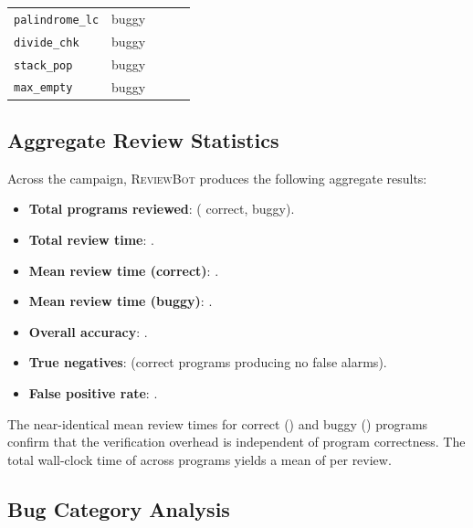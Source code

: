 \documentclass[11pt]{article}
\newcommand{\ReviewBot}{\textsc{ReviewBot}}
\begin{document}
\begin{table}[t]
\begin{tabular}{llrrr}
\texttt{palindrome\_lc} & buggy &
  \ppLXVIIrevpalindromenolowerProps{} &
  \ppLXVIIrevpalindromenolowerTime{} &
  \ppLXVIIrevpalindromenolowerVerdict{} \\
\texttt{divide\_chk} & buggy &
  \ppLXVIIrevdividenocheckProps{} &
  \ppLXVIIrevdividenocheckTime{} &
  \ppLXVIIrevdividenocheckVerdict{} \\
\texttt{stack\_pop} & buggy &
  \ppLXVIIrevstackwrongpopProps{} &
  \ppLXVIIrevstackwrongpopTime{} &
  \ppLXVIIrevstackwrongpopVerdict{} \\
\texttt{max\_empty} & buggy &
  \ppLXVIIrevmaxnoemptycheckProps{} &
  \ppLXVIIrevmaxnoemptycheckTime{} &
  \ppLXVIIrevmaxnoemptycheckVerdict{} \\
\bottomrule
\end{tabular}
\end{table}

\subsection{Aggregate Review Statistics}

Across the campaign, \ReviewBot{} produces the following aggregate results:
\begin{itemize}[leftmargin=*]
  \item \textbf{Total programs reviewed}: \ppLXVIIprogramCount{} 
        (\ppLXVIIcorrectCount{} correct, \ppLXVIIbuggyCount{} buggy).
  \item \textbf{Total review time}: \ppLXVIItimeTotal{}.
  \item \textbf{Mean review time (correct)}: \ppLXVIIcorrectTimeMean{}.
  \item \textbf{Mean review time (buggy)}: \ppLXVIIbuggyTimeMean{}.
  \item \textbf{Overall accuracy}: \ppLXVIIaccuracyPct{}.
  \item \textbf{True negatives}: \ppLXVIItrueNegative{}
        (correct programs producing no false alarms).
  \item \textbf{False positive rate}: \ppLXVIIfpRate{}.
\end{itemize}

The near-identical mean review times for correct (\ppLXVIIcorrectTimeMean{})
and buggy (\ppLXVIIbuggyTimeMean{}) programs confirm that the verification
overhead is independent of program correctness. The total wall-clock time
of \ppLXVIItimeTotal{} across \ppLXVIIprogramCount{} programs yields a mean
of \ppLXVIItimeMean{} per review.

\subsection{Bug Category Analysis}
\end{document}
